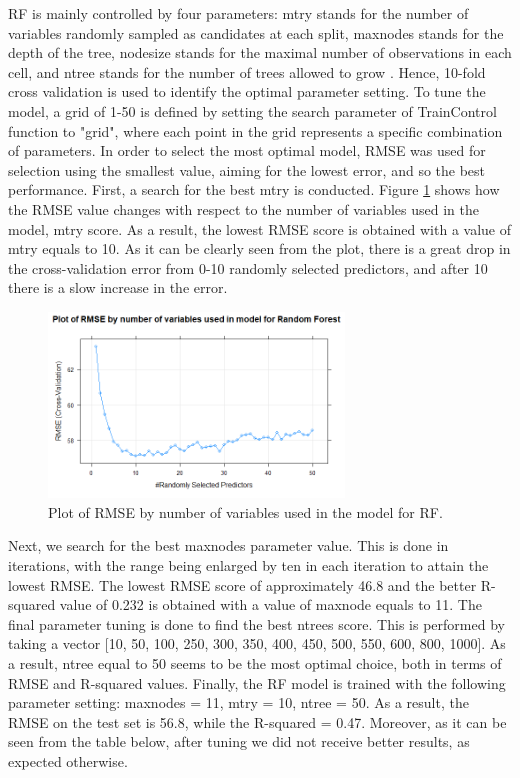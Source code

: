 \documentclass{usiinftr}
\begin{document}
RF is mainly controlled by four parameters: mtry stands for the number of variables randomly sampled as candidates at each split, maxnodes stands for the depth of the tree, nodesize stands for the maximal number of observations in each cell, and ntree stands for the number of trees allowed to grow \cite{26}. Hence, 10-fold cross validation is used to identify the optimal parameter setting. To tune the model, a grid of 1-50 is defined by setting the search parameter of TrainControl function to "grid", where each point in the grid represents a specific combination of parameters. In order to select the most optimal model, RMSE was used for selection using the smallest value, aiming for the lowest error, and so the best performance. First, a search for the best mtry is conducted. Figure \ref{RFRMSE} shows how the RMSE value changes with respect to the number  of variables used in the model, mtry score. As a result, the lowest RMSE score is obtained with a value of mtry equals to 10. As it can be clearly seen from the plot, there is a great drop in the cross-validation error from 0-10 randomly selected predictors, and after 10 there is a slow increase in the error. 

\begin{figure}[h!] 
\centering
\includegraphics[width=0.7\textwidth]{images/image121.png}
\caption{Plot of RMSE by number of variables used in the model for RF.}
\label{RFRMSE}
\end{figure}

Next, we search for the best maxnodes parameter value. This is done in iterations, with the range being enlarged by ten in each iteration to attain the lowest RMSE. The lowest RMSE score of approximately 46.8 and the better R-squared value of 0.232 is obtained with a value of maxnode equals to 11.  The final parameter tuning is done to find the best ntrees score. This is performed by taking a vector [10, 50, 100, 250, 300, 350, 400, 450, 500, 550, 600, 800, 1000]. As a result, ntree equal to 50 seems to be the most optimal choice, both in terms of RMSE and R-squared values. Finally, the RF model is trained with the following parameter setting: maxnodes = 11, mtry = 10, ntree = 50. As a result, the RMSE on the test set is 56.8, while the R-squared = 0.47. Moreover, as it can be seen from the table below, after tuning we did not receive better results, as expected otherwise. 
\end{document}

